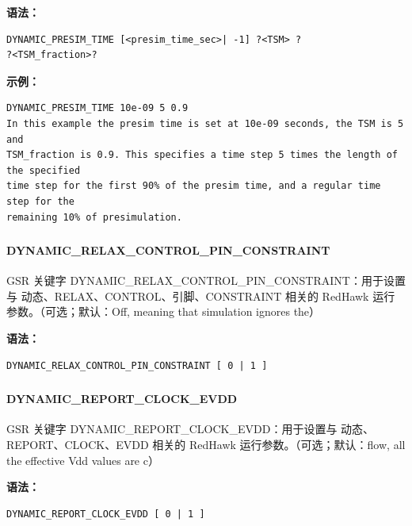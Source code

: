 \textbf{语法：}
\begin{lstlisting}
DYNAMIC_PRESIM_TIME [<presim_time_sec>| -1] ?<TSM> ?
?<TSM_fraction>?
\end{lstlisting}

\textbf{示例：}
\begin{lstlisting}
DYNAMIC_PRESIM_TIME 10e-09 5 0.9
In this example the presim time is set at 10e-09 seconds, the TSM is 5 and
TSM_fraction is 0.9. This specifies a time step 5 times the length of the specified
time step for the first 90% of the presim time, and a regular time step for the
remaining 10% of presimulation.
\end{lstlisting}

\subsubsection{}
\paragraph*{DYNAMIC_RELAX_CONTROL_PIN_CONSTRAINT}

GSR 关键字 DYNAMIC_RELAX_CONTROL_PIN_CONSTRAINT：用于设置与 动态、RELAX、CONTROL、引脚、CONSTRAINT 相关的 RedHawk 运行参数。（可选；默认：Off, meaning that simulation ignores the）

\textbf{语法：}
\begin{lstlisting}
DYNAMIC_RELAX_CONTROL_PIN_CONSTRAINT [ 0 | 1 ]
\end{lstlisting}

\subsubsection{}
\paragraph*{DYNAMIC_REPORT_CLOCK_EVDD}

GSR 关键字 DYNAMIC_REPORT_CLOCK_EVDD：用于设置与 动态、REPORT、CLOCK、EVDD 相关的 RedHawk 运行参数。（可选；默认：flow, all the effective Vdd values are c）

\textbf{语法：}
\begin{lstlisting}
DYNAMIC_REPORT_CLOCK_EVDD [ 0 | 1 ]
\end{lstlisting}

\subsubsection{}
